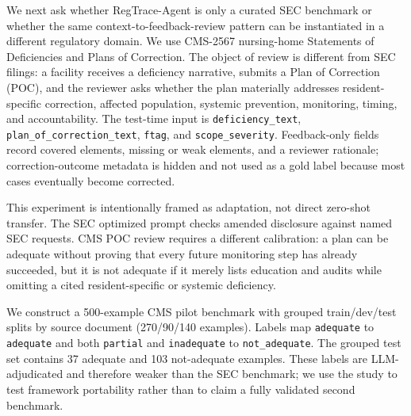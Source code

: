 \documentclass[11pt]{article}
\newcommand{\framework}{RegTrace-Agent}
\begin{document}
We next ask whether \framework{} is only a curated SEC benchmark or whether the same context-to-feedback-review pattern can be instantiated in a different regulatory domain. We use CMS-2567 nursing-home Statements of Deficiencies and Plans of Correction. The object of review is different from SEC filings: a facility receives a deficiency narrative, submits a Plan of Correction (POC), and the reviewer asks whether the plan materially addresses resident-specific correction, affected population, systemic prevention, monitoring, timing, and accountability. The test-time input is \texttt{deficiency\_text}, \texttt{plan\_of\_correction\_text}, \texttt{ftag}, and \texttt{scope\_severity}. Feedback-only fields record covered elements, missing or weak elements, and a reviewer rationale; correction-outcome metadata is hidden and not used as a gold label because most cases eventually become corrected.

This experiment is intentionally framed as adaptation, not direct zero-shot transfer. The SEC optimized prompt checks amended disclosure against named SEC requests. CMS POC review requires a different calibration: a plan can be adequate without proving that every future monitoring step has already succeeded, but it is not adequate if it merely lists education and audits while omitting a cited resident-specific or systemic deficiency.

We construct a 500-example CMS pilot benchmark with grouped train/dev/test splits by source document (270/90/140 examples). Labels map \texttt{adequate} to \texttt{adequate} and both \texttt{partial} and \texttt{inadequate} to \texttt{not\_adequate}. The grouped test set contains 37 adequate and 103 not-adequate examples. These labels are LLM-adjudicated and therefore weaker than the SEC benchmark; we use the study to test framework portability rather than to claim a fully validated second benchmark.
\end{document}
